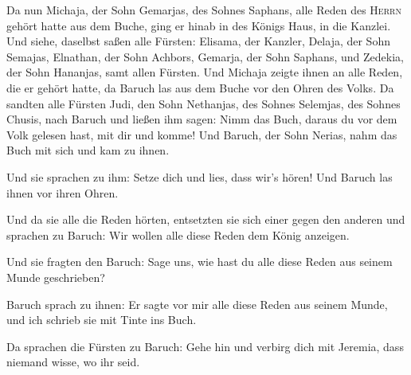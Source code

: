  Da nun Michaja, der Sohn Gemarjas, des Sohnes Saphans,
alle Reden des \textsc{Herrn} gehört hatte aus dem Buche,
 ging er hinab in des Königs Haus, in die Kanzlei. Und
siehe, daselbst saßen alle Fürsten: Elisama, der Kanzler, Delaja, der
Sohn Semajas, Elnathan, der Sohn Achbors, Gemarja, der Sohn Saphans, und
Zedekia, der Sohn Hananjas, samt allen Fürsten.  Und
Michaja zeigte ihnen an alle Reden, die er gehört hatte, da Baruch las
aus dem Buche vor den Ohren des Volks.  Da sandten alle
Fürsten Judi, den Sohn Nethanjas, des Sohnes Selemjas, des Sohnes
Chusis, nach Baruch und ließen ihm sagen: Nimm das Buch, daraus du vor
dem Volk gelesen hast, mit dir und komme! Und Baruch, der Sohn Nerias,
nahm das Buch mit sich und kam zu ihnen.

 Und sie sprachen zu ihm: Setze dich und lies, dass wir's
hören! Und Baruch las ihnen vor ihren Ohren.

 Und da sie alle die Reden hörten, entsetzten sie sich
einer gegen den anderen und sprachen zu Baruch: Wir wollen alle diese
Reden dem König anzeigen.

 Und sie fragten den Baruch: Sage uns, wie hast du alle
diese Reden aus seinem Munde geschrieben?

 Baruch sprach zu ihnen: Er sagte vor mir alle diese
Reden aus seinem Munde, und ich schrieb sie mit Tinte ins Buch.

 Da sprachen die Fürsten zu Baruch: Gehe hin und verbirg
dich mit Jeremia, dass niemand wisse, wo ihr seid.

